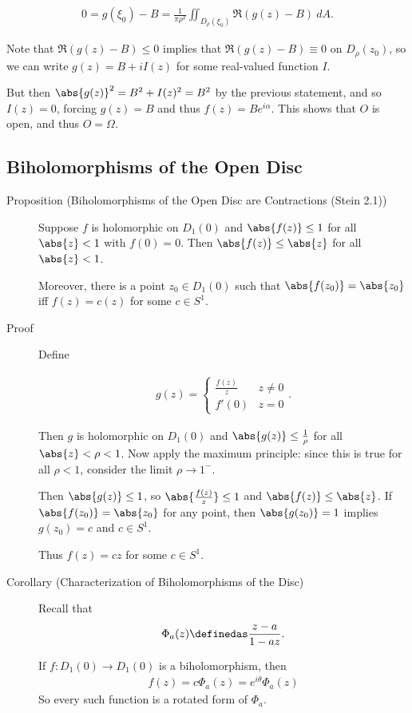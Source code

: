 \begin{description}
\begin{align*}
0 = g(\xi_0) - B = \frac{1}{\pi\rho^2} \iint_{D_\rho(\xi_0)} \Re( g(z) - B ) ~dA
.\end{align*}

Note that \(\Re(g(z) - B) \leq 0\) implies that
\(\Re(g(z) - B) \equiv 0\) on \(D_\rho(z_0)\), so we can write
\(g(z) = B + iI(z)\) for some real-valued function \(I\).

But then \(\abs{g(z)}^2 = B^2 + I(z)^2 = B^2\) by the previous
statement, and so \(I(z) = 0\), forcing \(g(z) = B\) and thus
\(f(z) = Be^{i\alpha}\). This shows that \(O\) is open, and thus
\(O = \Omega\).
\end{description}

\hypertarget{biholomorphisms-of-the-open-disc}{%
\subsection{Biholomorphisms of the Open
Disc}\label{biholomorphisms-of-the-open-disc}}

\begin{description}
\item[Proposition (Biholomorphisms of the Open Disc are Contractions
(Stein 2.1))]
Suppose \(f\) is holomorphic on \(D_1(0)\) and \(\abs{f(z)} \leq 1\) for
all \(\abs{z} < 1\) with \(f(0) = 0\). Then \(\abs{f(z)} \leq \abs{z}\)
for all \(\abs{z} < 1\).

Moreover, there is a point \(z_0\in D_1(0)\) such that
\(\abs{f(z_0)} = \abs{z_0}\) iff \(f(z) = c(z)\) for some \(c \in S^1\).
\item[Proof]
Define

\begin{align*}
g(z) =
\begin{cases}
\frac{f(z)}{z} & z\neq 0 \\
f'(0) & z = 0
\end{cases}
.\end{align*}

Then \(g\) is holomorphic on \(D_1(0)\) and
\(\abs{g(z)} \leq \frac{1}{\rho}\) for all \(\abs{z} < \rho < 1\). Now
apply the maximum principle: since this is true for all \(\rho < 1\),
consider the limit \(\rho\to 1^-\).

Then \(\abs{g(z)} \leq 1\), so \(\abs{\frac{f(z)}{z}} \leq 1\) and
\(\abs{f(z)} \leq \abs{z}\). If \(\abs{f(z_0)} = \abs{z_0}\) for any
point, then \(\abs{g(z_0)} = 1\) implies \(g(z_0) = c\) and
\(c\in S^1\).

Thus \(f(z) = cz\) for some \(c\in S^1\).
\item[Corollary (Characterization of Biholomorphisms of the Disc)]
Recall that
\begin{align*}\Phi_a(z) \definedas \frac{z-a}{1-az}.\end{align*}

If \(f: D_1(0) \to D_1(0)\) is a biholomorphism, then
\begin{align*}f(z) = c \Phi_a(z) = e^{i\theta} \Phi_a(z)\end{align*} So
every such function is a rotated form of \(\Phi_a\).
\end{description}

